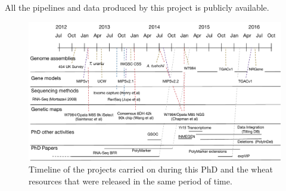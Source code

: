 All the pipelines and data produced by this project is publicly available.  



\begin{landscape}
 \begin{figure}
  \centering
  \includegraphics[height=0.9\textheight]{Introduction/RicardoPhdTimelineV1.pdf}
  \caption[PhD timeline.]{Timeline of the projects carried on during this PhD and the wheat resources that were released in the same period of time. }
  \label{fig:intro:timeline}
 \end{figure}
\end{landscape}


